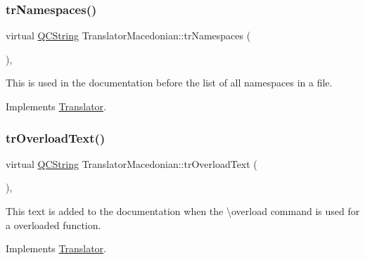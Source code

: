 \mbox{\label{class_translator_macedonian_ac1a9356d602118baccbd511506f17e72}} 
\subsubsection{\texorpdfstring{trNamespaces()}{trNamespaces()}}
{\footnotesize\ttfamily virtual \mbox{\hyperlink{class_q_c_string}{Q\+C\+String}} Translator\+Macedonian\+::tr\+Namespaces (\begin{DoxyParamCaption}{ }\end{DoxyParamCaption})\hspace{0.3cm}{\ttfamily [inline]}, {\ttfamily [virtual]}}

This is used in the documentation before the list of all namespaces in a file. 

Implements \mbox{\hyperlink{class_translator}{Translator}}.

\mbox{\label{class_translator_macedonian_a325b33ea816553dda7e4db9a7e6dee2b}} 
\subsubsection{\texorpdfstring{trOverloadText()}{trOverloadText()}}
{\footnotesize\ttfamily virtual \mbox{\hyperlink{class_q_c_string}{Q\+C\+String}} Translator\+Macedonian\+::tr\+Overload\+Text (\begin{DoxyParamCaption}{ }\end{DoxyParamCaption})\hspace{0.3cm}{\ttfamily [inline]}, {\ttfamily [virtual]}}

This text is added to the documentation when the \textbackslash{}overload command is used for a overloaded function. 

Implements \mbox{\hyperlink{class_translator}{Translator}}.

\mbox{\label{class_translator_macedonian_a8d0529dff43b12fb0b5181eedbdc60b2}} 
